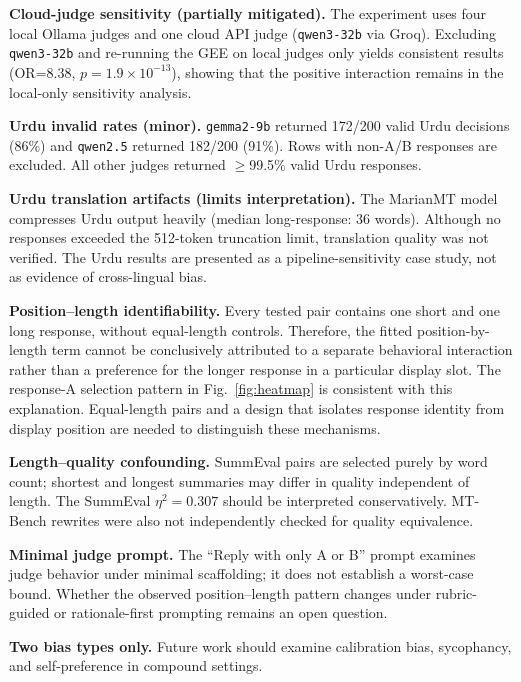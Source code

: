 \documentclass[10pt,conference]{IEEEtran}
\begin{document}
\textbf{Cloud-judge sensitivity (partially mitigated).} The experiment uses four local Ollama judges and one cloud API judge (\texttt{qwen3-32b} via Groq). Excluding \texttt{qwen3-32b} and re-running the GEE on local judges only yields consistent results (OR=8.38, $p=1.9\times10^{-13}$), showing that the positive interaction remains in the local-only sensitivity analysis.

\textbf{Urdu invalid rates (minor).} \texttt{gemma2-9b} returned 172/200 valid Urdu decisions (86\%) and \texttt{qwen2.5} returned 182/200 (91\%). Rows with non-A/B responses are excluded. All other judges returned $\geq$99.5\% valid Urdu responses.

\textbf{Urdu translation artifacts (limits interpretation).} The MarianMT model compresses Urdu output heavily (median long-response: 36 words). Although no responses exceeded the 512-token truncation limit, translation quality was not verified. The Urdu results are presented as a pipeline-sensitivity case study, not as evidence of cross-lingual bias.

\textbf{Position--length identifiability.} Every tested pair contains one short and one long response, without equal-length controls. Therefore, the fitted position-by-length term cannot be conclusively attributed to a separate behavioral interaction rather than a preference for the longer response in a particular display slot. The response-A selection pattern in Fig.~\ref{fig:heatmap} is consistent with this explanation. Equal-length pairs and a design that isolates response identity from display position are needed to distinguish these mechanisms.\par

\textbf{Length--quality confounding.} SummEval pairs are selected purely by word count; shortest and longest summaries may differ in quality independent of length. The SummEval $\eta^2=0.307$ should be interpreted conservatively. MT-Bench rewrites were also not independently checked for quality equivalence.

\textbf{Minimal judge prompt.} The ``Reply with only A or B'' prompt examines judge behavior under minimal scaffolding; it does not establish a worst-case bound. Whether the observed position--length pattern changes under rubric-guided or rationale-first prompting remains an open question.

\textbf{Two bias types only.} Future work should examine calibration bias, sycophancy, and self-preference in compound settings.
\end{document}

